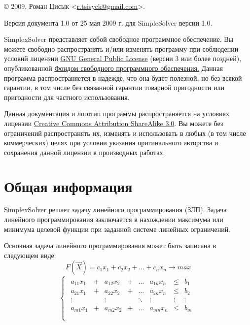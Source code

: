 \documentclass[pdftex, unicode, a4paper,12pt,oneside,utf8x, usehyperref]{report-gost}
\begin{document}
© 2009, Роман Цисык <\href{mailto:r.tsisyck@gmail.com}{r.tsisyck@gmail.com}>.

Версия документа 1.0 от 25 мая 2009 г. для SimpleSolver версии 1.0.

SimplexSolver представляет собой свободное программное обеспечение.
Вы можете свободно распространять и/или изменять программу при соблюдении условий лицензии \href{http://www.gnu.org/licenses/gpl.html}{GNU General Public License}
(версии 3 или более поздней), опубликованной
\href{http://www.fsf.org/}{Фондом свободного программного обеспечения.}
Данная программа распространяется в надежде, что она будет полезной,
но без всякой гарантии, в том числе без связанной гарантии товарной пригодности
или пригодности для частного использования.

Данная документация и логотип программы распространяется на условиях лицензии \href{http://www.creativecommons.org/licenses/by-sa/3.0/}{Creative Commons Attribution ShareAlike 3.0}.
Вы можете без ограничений распространять их, изменять и использовать в любых (в том числе коммерческих) целях при условии указания оригинального авторства и сохранения данной лицензии в производных работах.

\newpage

\frontmatter %

\tableofcontents

\mainmatter %

\chapter{Общая информация}
SimplexSolver решает задачу линейного программирования (ЗЛП).
Задача линейного программирования заключается в нахождении
максимума или минимума целевой функции при заданной системе линейных ограничений.

Основная задача линейного программирования может быть записана в следующем виде:
\begin{equation}
F(\vec{X}) = c_1 x_1 + c_2 x_2 + \hdots + c_n x_n \to max
\end{equation}
\begin{equation}
\label{limits}
\begin{cases}
\begin{matrix}
a_{11} x_1 & + & a_{12} x_2 & + & \hdots &a_{1n} x_n &\le & b_1 \\
a_{21} x_1 & + & a_{22} x_2 & + & \hdots &a_{2n} x_n &\le & b_2 \\
\vdots     & ~ & \vdots     & ~ & \ddots &\vdots     & \vdots & \vdots \\
a_{m1} x_1 & + & a_{m2} x_2 & + & \hdots &a_{mn} x_n &\le & b_m \\
\end{matrix} \\
\end{cases}
\end{equation}
\end{document}
